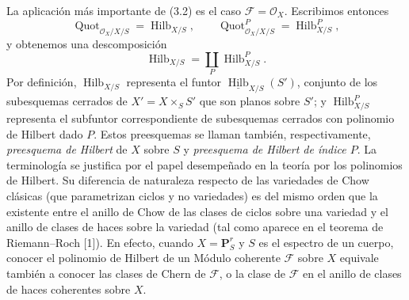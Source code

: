 La aplicación más importante de (3.2) es el caso
$\mathcal F=\mathcal O_X$. Escribimos entonces
\[
\operatorname{Quot}_{\mathcal O_X/X/S}=\operatorname{Hilb}_{X/S},
\qquad
\operatorname{Quot}^P_{\mathcal O_X/X/S}=\operatorname{Hilb}^P_{X/S},
\]
y obtenemos una descomposición
\[
\operatorname{Hilb}_{X/S}=\coprod_P\operatorname{Hilb}^P_{X/S}.
\]
Por definición, $\operatorname{Hilb}_{X/S}$ representa el funtor
$\underline{\operatorname{Hilb}}_{X/S}(S')$, conjunto de los subesquemas
cerrados de $X'=X\times_SS'$ que son planos sobre $S'$; y
$\operatorname{Hilb}^P_{X/S}$ representa el subfuntor correspondiente de
subesquemas cerrados con polinomio de Hilbert dado $P$. Estos preesquemas se
llaman también, respectivamente, \emph{preesquema de Hilbert} de $X$ sobre
$S$ y \emph{preesquema de Hilbert de índice $P$}. La terminología se justifica
por el papel desempeñado en la teoría por los polinomios de Hilbert. Su
diferencia de naturaleza respecto de las variedades de Chow clásicas (que
parametrizan ciclos y no variedades) es del mismo orden que la existente entre
el anillo de Chow de las clases de ciclos sobre una variedad y el anillo de
clases de haces sobre la variedad (tal como aparece en el teorema de
Riemann--Roch [1]). En efecto, cuando $X=\mathbf P^r_S$ y $S$ es el espectro
de un cuerpo, conocer el polinomio de Hilbert de un Módulo coherente
$\mathcal F$ sobre $X$ equivale también a conocer las clases de Chern de
$\mathcal F$, o la clase de $\mathcal F$ en el anillo de clases de haces
coherentes sobre $X$.


